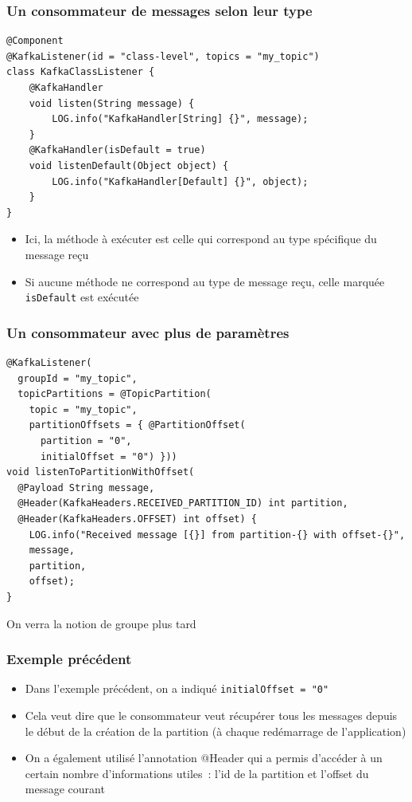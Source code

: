 \documentclass{beamer}
\begin{document}
\begin{frame}[fragile]
	\frametitle{Un consommateur de messages selon leur type}
\begin{lstlisting}
@Component
@KafkaListener(id = "class-level", topics = "my_topic")
class KafkaClassListener {
	@KafkaHandler
	void listen(String message) {
		LOG.info("KafkaHandler[String] {}", message);
	}
	@KafkaHandler(isDefault = true)
	void listenDefault(Object object) {
		LOG.info("KafkaHandler[Default] {}", object);
	}
}
\end{lstlisting}
	\begin{itemize}
		\item Ici, la méthode à exécuter est celle qui correspond au type spécifique du message reçu
		\item Si aucune méthode ne correspond au type de message reçu, celle marquée \texttt{isDefault} est exécutée
	\end{itemize}
\end{frame} 

\begin{frame}[fragile]
	\frametitle{Un consommateur avec plus de paramètres}
\begin{lstlisting}
@KafkaListener(
  groupId = "my_topic",
  topicPartitions = @TopicPartition(
    topic = "my_topic",
    partitionOffsets = { @PartitionOffset(
	  partition = "0",
	  initialOffset = "0") }))
void listenToPartitionWithOffset(
  @Payload String message,
  @Header(KafkaHeaders.RECEIVED_PARTITION_ID) int partition,
  @Header(KafkaHeaders.OFFSET) int offset) {
	LOG.info("Received message [{}] from partition-{} with offset-{}",
	message,
	partition,
	offset);
}
\end{lstlisting}
On verra la notion de groupe plus tard
\end{frame} 

\begin{frame}[fragile]
	\frametitle{Exemple précédent}
	\begin{itemize}
		\item Dans l'exemple précédent, on a indiqué \texttt{initialOffset = "0"}
		\item Cela veut dire que le consommateur veut récupérer tous les messages depuis le début de la création de la partition (à chaque redémarrage de l'application)
		\item On a également utilisé l'annotation @Header qui a permis d'accéder à un certain nombre d'informations utiles~: l'id de la partition et l'offset du message courant

	\end{itemize}
\end{frame} 
\end{document}
